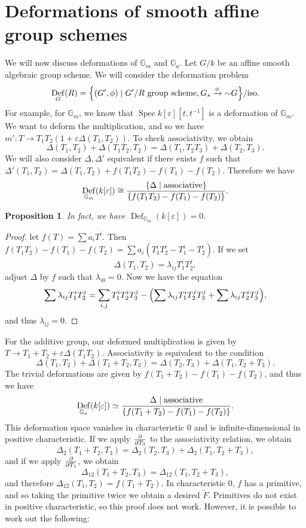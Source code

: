 \documentclass[leqno, openany]{memoir}
\newtheorem{prop}[thm]{Proposition}
\theoremstyle{definition}
\theoremstyle{remark}
\theoremstyle{plain}
\theoremstyle{definition}
\theoremstyle{remark}
\newcommand{\G}{\mathbb{G}}
\newcommand{\ep}{\varepsilon}
\newcommand{\mr}[1]{\mathrm{#1}}
\newcommand{\wt}[1]{\widetilde{#1}}
\DeclareMathOperator{\Def}{Def}
\DeclareMathOperator{\Spec}{Spec}
\begin{document}
\section{Deformations of smooth affine group schemes}%
\label{sec:deformations_of_smooth_affine_group_schemes}

We will now discuss deformations of $\G_m$ and $\G_a$. Let $G/k$ be an affine smooth algebraic group scheme. We will consider the deformation problem
\[ \Def_G(R) = \qty{(G', \phi) \mid G'/R \text{ group scheme}, G_s \xrightarrow{\phi}{\sim} G} / \mr{iso}. \]
For example, for $\G_m$, we know that $\Spec k[\ep][t, t^{-1}]$ is a deformation of $\G_m$. We want to deform the multiplication, and so we have $m' \colon T \to T_1 T_2 (1 + \ep \Delta(T_1, T_2))$. To check associativity, we obtain 
\[ \Delta(T_1, T_2) + \Delta(T_1 T_2, T_2) = \Delta(T_1, T_2 T_3) + \Delta(T_2, T_3). \]
We will also consider $\Delta, \Delta'$ equivalent if there exists $f$ such that $\Delta'(T_1, T_2) = \Delta(T_1, T_2) + f(T_1 T_2) - f(T_1) - f(T_2)$. Therefore we have
\[ \Def_{\G_m}(k[\ep]) \cong \frac{\qty{\Delta \mid \text{associative}}}{\qty{f(T_1T_2) - f(T_1) - f(T_2)}}. \]

\begin{prop}
    In fact, we have $\Def_{\G_m}(k[\ep]) = 0$.
\end{prop}

\begin{proof}
    let $f(T) = \sum a_i T^i$. Then $f(T_1 T_2) - f(T_1) - f(T_2) = \sum a_i (T_1^i T_2^i - T_1^i - T_2^i)$. If we set
    \[ \Delta(T_1, T_2) = \lambda_{ij} T_1^i T_2^j, \]
    adjust $\Delta$ by $f$ such that $\lambda_{i0} = 0$. Now we have the equation
    \[ \sum \lambda_{ij} T_1^i T_2^j = \sum_{i,j} T_1^i T_2^i T_3^j - \qty(\sum \lambda_{ij} T_1^i T_2^j T_3^j + \sum \lambda_{ij} T_2^i T_3^j), \]
    and thus $\lambda_{ij} = 0$.
\end{proof}

For the additive group, our deformed multiplication is given by $T \to T_1 + T_2 + \ep \Delta(T_1 T_2)$. Associativity is equivalent to the condition
\[ \Delta(T_1, T_2) + \Delta(T_1 + T_2, T_3) = \Delta(T_2, T_3) + \Delta(T_1, T_2 + T_3). \]
The trivial deformations are given by $f(T_1 + T_2) - f(T_1) - f(T_2)$, and thus we have
\[ \Def_{\G_a}(k[\ep]) \simeq \frac{\Delta \mid \text{associative}}{\qty{f(T_1 + T_2) - f(T_1) - f(T_2)}}. \]
This deformation space vanishes in characteristic $0$ and is infinite-dimensional in positive characteristic. If we apply $\pdv{T_3}$ to the associativity relation, we obtain
\[ \Delta_2(T_1 + T_2, T_3) = \Delta_2(T_2, T_3) + \Delta_2(T_1, T_2 + T_3), \]
and if we apply $\pdv{T_1}$, we obtain
\[ \Delta_{12}(T_1 + T_2, T_3) = \Delta_{12}(T_1, T_2 + T_3), \]
and therefore $\Delta_{12}(T_1, T_2) = f(T_1 + T_2)$. In characteristic $0$, $f$ has a primitive, and so taking the primitive twice we obtain a desired $\wt{F}$. Primitives do not exist in positive characteristic, so this proof does not work. However, it is possible to work out the following:
\end{document}
